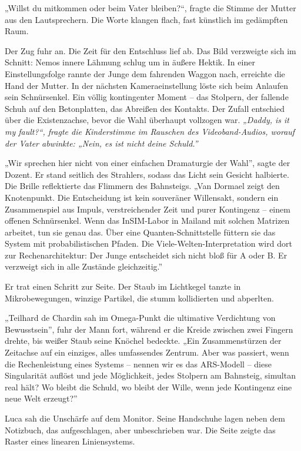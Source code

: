 \documentclass[
  ngerman,
]{article}
\begin{document}
„Willst du mitkommen oder beim Vater bleiben?{\kern0pt}``, fragte die
Stimme der Mutter aus den Lautsprechern. Die Worte klangen flach, fast
künstlich im gedämpften Raum.

Der Zug fuhr an. Die Zeit für den Entschluss lief ab. Das Bild
verzweigte sich im Schnitt: Nemos innere Lähmung schlug um in äußere
Hektik. In einer Einstellungsfolge rannte der Junge dem fahrenden Waggon
nach, erreichte die Hand der Mutter. In der nächsten Kameraeinstellung
löste sich beim Anlaufen sein Schnürsenkel. Ein völlig kontingenter
Moment -- das Stolpern, der fallende Schuh auf den Betonplatten, das
Abreißen des Kontakts. Der Zufall entschied über die Existenzachse,
bevor die Wahl überhaupt vollzogen war. \emph{„Daddy, is it my
fault?``\emph{, fragte die Kinderstimme im Rauschen des
Videoband-Audios, worauf der Vater abwinkte: }„Nein, es ist nicht deine
Schuld.''}

„Wir sprechen hier nicht von einer einfachen Dramaturgie der Wahl'',
sagte der Dozent. Er stand seitlich des Strahlers, sodass das Licht sein
Gesicht halbierte. Die Brille reflektierte das Flimmern des Bahnsteigs.
„Van Dormael zeigt den Knotenpunkt. Die Entscheidung ist kein souveräner
Willensakt, sondern ein Zusammenspiel aus Impuls, verstreichender Zeit
und purer Kontingenz -- einem offenen Schnürsenkel. Wenn das InSIM-Labor
in Mailand mit solchen Matrizen arbeitet, tun sie genau das. Über eine
Quanten-Schnittstelle füttern sie das System mit probabilistischen
Pfaden. Die Viele-Welten-Interpretation wird dort zur Rechenarchitektur:
Der Junge entscheidet sich nicht bloß für A oder B. Er verzweigt sich in
alle Zustände gleichzeitig.''

Er trat einen Schritt zur Seite. Der Staub im Lichtkegel tanzte in
Mikrobewegungen, winzige Partikel, die stumm kollidierten und abperlten.

„Teilhard de Chardin sah im Omega-Punkt die ultimative Verdichtung von
Bewusstsein'', fuhr der Mann fort, während er die Kreide zwischen zwei
Fingern drehte, bis weißer Staub seine Knöchel bedeckte. „Ein
Zusammenstürzen der Zeitachse auf ein einziges, alles umfassendes
Zentrum. Aber was passiert, wenn die Rechenleistung eines Systems --
nennen wir es das ARS-Modell -- diese Singularität auflöst und jede
Möglichkeit, jedes Stolpern am Bahnsteig, simultan real hält? Wo bleibt
die Schuld, wo bleibt der Wille, wenn jede Kontingenz eine neue Welt
erzeugt?''

Luca sah die Unschärfe auf dem Monitor. Seine Handschuhe lagen neben dem
Notizbuch, das aufgeschlagen, aber unbeschrieben war. Die Seite zeigte
das Raster eines linearen Liniensystems.
\end{document}
